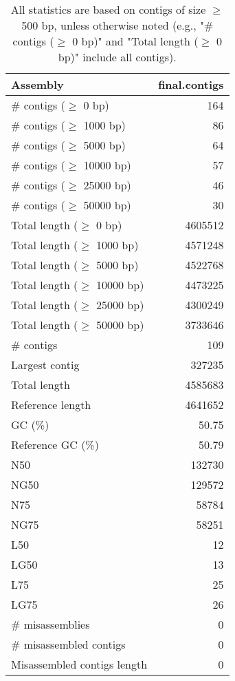 \documentclass[12pt,a4paper]{article}
\begin{document}
\begin{table}[ht]
\begin{center}
\caption{All statistics are based on contigs of size $\geq$ 500 bp, unless otherwise noted (e.g., "\# contigs ($\geq$ 0 bp)" and "Total length ($\geq$ 0 bp)" include all contigs).}
\begin{tabular}{|l*{1}{|r}|}
\hline
Assembly & final.contigs \\ \hline
\# contigs ($\geq$ 0 bp) & 164 \\ \hline
\# contigs ($\geq$ 1000 bp) & 86 \\ \hline
\# contigs ($\geq$ 5000 bp) & 64 \\ \hline
\# contigs ($\geq$ 10000 bp) & 57 \\ \hline
\# contigs ($\geq$ 25000 bp) & 46 \\ \hline
\# contigs ($\geq$ 50000 bp) & 30 \\ \hline
Total length ($\geq$ 0 bp) & 4605512 \\ \hline
Total length ($\geq$ 1000 bp) & 4571248 \\ \hline
Total length ($\geq$ 5000 bp) & 4522768 \\ \hline
Total length ($\geq$ 10000 bp) & 4473225 \\ \hline
Total length ($\geq$ 25000 bp) & 4300249 \\ \hline
Total length ($\geq$ 50000 bp) & 3733646 \\ \hline
\# contigs & 109 \\ \hline
Largest contig & 327235 \\ \hline
Total length & 4585683 \\ \hline
Reference length & 4641652 \\ \hline
GC (\%) & 50.75 \\ \hline
Reference GC (\%) & 50.79 \\ \hline
N50 & 132730 \\ \hline
NG50 & 129572 \\ \hline
N75 & 58784 \\ \hline
NG75 & 58251 \\ \hline
L50 & 12 \\ \hline
LG50 & 13 \\ \hline
L75 & 25 \\ \hline
LG75 & 26 \\ \hline
\# misassemblies & 0 \\ \hline
\# misassembled contigs & 0 \\ \hline
Misassembled contigs length & 0 \\ \hline

\end{tabular}
\end{center}
\end{table}
\end{document}
